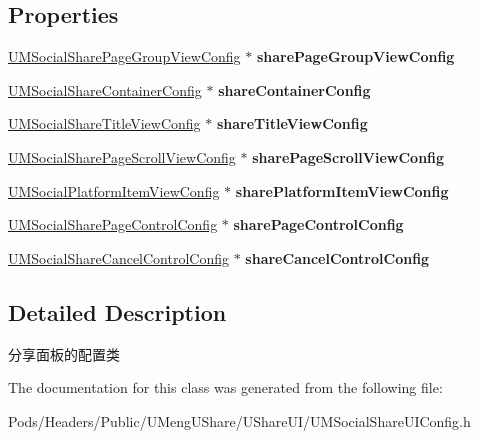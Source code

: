 \subsection*{Properties}
\begin{DoxyCompactItemize}
\item 
\mbox{\label{interface_u_m_social_share_u_i_config_a6bd1e3075b34d80e0b079dd74059c632}} 
\mbox{\hyperlink{interface_u_m_social_share_page_group_view_config}{U\+M\+Social\+Share\+Page\+Group\+View\+Config}} $\ast$ {\bfseries share\+Page\+Group\+View\+Config}
\item 
\mbox{\label{interface_u_m_social_share_u_i_config_a1599ee30d5d01569e025bbe50416d1d2}} 
\mbox{\hyperlink{interface_u_m_social_share_container_config}{U\+M\+Social\+Share\+Container\+Config}} $\ast$ {\bfseries share\+Container\+Config}
\item 
\mbox{\label{interface_u_m_social_share_u_i_config_ab824c9fe2a46717bf4c8edcd6f54eda3}} 
\mbox{\hyperlink{interface_u_m_social_share_title_view_config}{U\+M\+Social\+Share\+Title\+View\+Config}} $\ast$ {\bfseries share\+Title\+View\+Config}
\item 
\mbox{\label{interface_u_m_social_share_u_i_config_a54f9c615030b96ebb473d8f77c5c5829}} 
\mbox{\hyperlink{interface_u_m_social_share_page_scroll_view_config}{U\+M\+Social\+Share\+Page\+Scroll\+View\+Config}} $\ast$ {\bfseries share\+Page\+Scroll\+View\+Config}
\item 
\mbox{\label{interface_u_m_social_share_u_i_config_a4508a57d92526d3c847fd104018d5af3}} 
\mbox{\hyperlink{interface_u_m_social_platform_item_view_config}{U\+M\+Social\+Platform\+Item\+View\+Config}} $\ast$ {\bfseries share\+Platform\+Item\+View\+Config}
\item 
\mbox{\label{interface_u_m_social_share_u_i_config_a020ff873375a8da3d3bff1c3759d87c5}} 
\mbox{\hyperlink{interface_u_m_social_share_page_control_config}{U\+M\+Social\+Share\+Page\+Control\+Config}} $\ast$ {\bfseries share\+Page\+Control\+Config}
\item 
\mbox{\label{interface_u_m_social_share_u_i_config_a9f0a9c72a6bc608581e8e4dbfc30440b}} 
\mbox{\hyperlink{interface_u_m_social_share_cancel_control_config}{U\+M\+Social\+Share\+Cancel\+Control\+Config}} $\ast$ {\bfseries share\+Cancel\+Control\+Config}
\end{DoxyCompactItemize}


\subsection{Detailed Description}
分享面板的配置类 

The documentation for this class was generated from the following file\+:\begin{DoxyCompactItemize}
\item 
Pods/\+Headers/\+Public/\+U\+Meng\+U\+Share/\+U\+Share\+U\+I/U\+M\+Social\+Share\+U\+I\+Config.\+h\end{DoxyCompactItemize}
